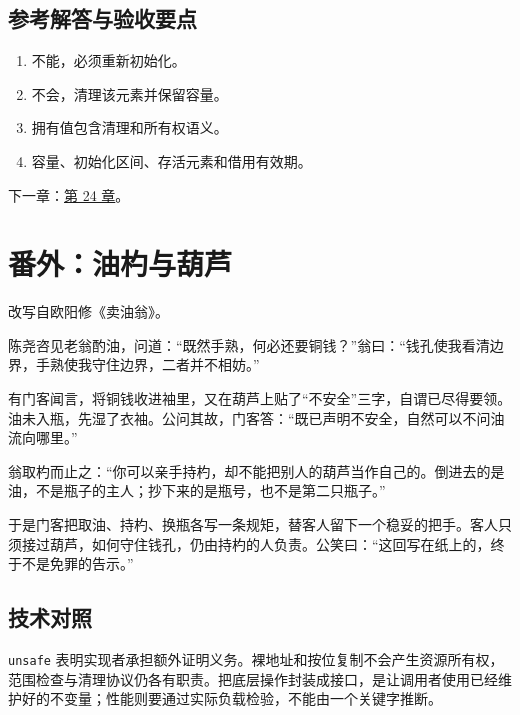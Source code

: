 \subsection*{参考解答与验收要点}

\begin{enumerate}

\item 不能，必须重新初始化。

\item 不会，清理该元素并保留容量。

\item 拥有值包含清理和所有权语义。

\item 容量、初始化区间、存活元素和借用有效期。

\end{enumerate}

下一章：\hyperref[ch:24]{第 24 章}。

\section{番外：油杓与葫芦}

改写自欧阳修《卖油翁》。

陈尧咨见老翁酌油，问道：“既然手熟，何必还要铜钱？”翁曰：“钱孔使我看清边界，手熟使我守住边界，二者并不相妨。”

有门客闻言，将铜钱收进袖里，又在葫芦上贴了“不安全”三字，自谓已尽得要领。油未入瓶，先湿了衣袖。公问其故，门客答：“既已声明不安全，自然可以不问油流向哪里。”

翁取杓而止之：“你可以亲手持杓，却不能把别人的葫芦当作自己的。倒进去的是油，不是瓶子的主人；抄下来的是瓶号，也不是第二只瓶子。”

于是门客把取油、持杓、换瓶各写一条规矩，替客人留下一个稳妥的把手。客人只须接过葫芦，如何守住钱孔，仍由持杓的人负责。公笑曰：“这回写在纸上的，终于不是免罪的告示。”

\subsection*{技术对照}

\texttt{unsafe} 表明实现者承担额外证明义务。裸地址和按位复制不会产生资源所有权，范围检查与清理协议仍各有职责。把底层操作封装成接口，是让调用者使用已经维护好的不变量；性能则要通过实际负载检验，不能由一个关键字推断。
